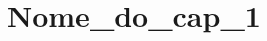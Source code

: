 \documentclass[
	oldfontcommands,
	sumario=tradicional,
	12pt,      %
	openright, %
	oneside,   %
	a4paper,   %
	english, %
	brazil   %
	]{imecc-unicamp}
\begin{document}
		\chapter{Nome_do_cap_1} \label{cap_ideia_do_nome}
		
		
		

\postextual
\nocite{masolo2010}

\begin{apendicesenv}
\partapendices

\end{apendicesenv}
\begin{anexosenv}
\partanexos

\end{anexosenv}
\end{document}
